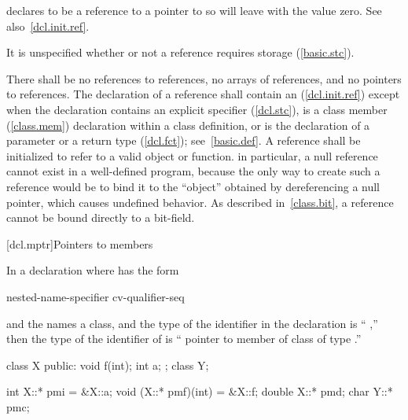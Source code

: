 declares
to be a reference to a pointer to
so
will leave
with the value zero.
See also~\ref{dcl.init.ref}.
\exitexample

\pnum
It is unspecified whether or not
a reference requires storage (\ref{basic.stc}).

\pnum
{}%
There shall be no references to references,
no arrays of references, and no pointers to references.
%
The declaration of a reference shall contain an
(\ref{dcl.init.ref})
except when the declaration contains an explicit
specifier (\ref{dcl.stc}),
is a class member (\ref{class.mem}) declaration within a class definition,
or is the declaration of a parameter or a return type (\ref{dcl.fct}); see~\ref{basic.def}.
A reference shall be initialized to refer to a valid object or function.
\enternote
{}%
in particular, a null reference cannot exist in a well-defined program,
because the only way to create such a reference would be to bind it to
the ``object'' obtained by dereferencing a null pointer,
which causes undefined behavior.
As described in~\ref{class.bit}, a reference cannot be bound directly
to a bit-field.
\exitnote

[dcl.mptr]{Pointers to members}%

\pnum
In a declaration
where
has the form

\begin{ncsimplebnf}
\terminal{::}\opt nested-name-specifier \terminal{*} cv-qualifier-seq\opt {}
\end{ncsimplebnf}

and the
names a class,
and the type of the identifier in the declaration
is ``
,''
then the type of the identifier of
is `` pointer to member of class
 of type
.''

\pnum
\enterexample%

\begin{codeblock}
class X {
public:
    void f(int);
    int a;
};
class Y;

int X::* pmi = &X::a;
void (X::* pmf)(int) = &X::f;
double X::* pmd;
char Y::* pmc;
\end{codeblock}


